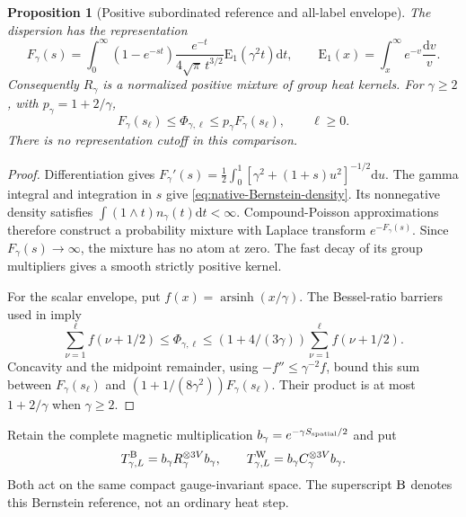 \documentclass[11pt,oneside,openany]{book}
\newtheorem{proposition}[proposition]{Proposition}
\theoremstyle{definition}
\theoremstyle{remark}
\newcommand{\dd}{\mathrm d}
\newcommand{\src}[2]{\cite[#2]{#1}}
\begin{document}
\begin{proposition}[Positive subordinated reference and all-label envelope]
\label{prop:native-Bernstein}
The dispersion has the representation
\begin{equation}
 F_\gamma(s)=\int_0^\infty(1-e^{-st})
       \frac{e^{-t}}{4\sqrt\pi\,t^{3/2}}
       \mathrm E_1(\gamma^2t)\dd t,
 \qquad \mathrm E_1(x)=\int_x^\infty e^{-v}\frac{\dd v}{v}.
 \label{eq:native-Bernstein-density}
\end{equation}
Consequently $R_\gamma$ is a normalized positive mixture of group heat
kernels. For $\gamma\ge2$, with $p_\gamma=1+2/\gamma$,
\begin{equation}
 F_\gamma(s_\ell)\le\Phi_{\gamma,\ell}
                   \le p_\gamma F_\gamma(s_\ell),\qquad \ell\ge0.
 \label{eq:native-all-label-envelope}
\end{equation}
There is no representation cutoff in this comparison.
\end{proposition}
\begin{proof}
Differentiation gives
$F_\gamma'(s)=\tfrac12\int_0^1[\gamma^2+(1+s)u^2]^{-1/2}\dd u$.
The gamma integral and integration in $s$ give
\cref{eq:native-Bernstein-density}. Its nonnegative density satisfies
$\int(1\wedge t)n_\gamma(t)\dd t<\infty$. Compound-Poisson
approximations therefore construct a probability mixture with Laplace
transform $e^{-F_\gamma(s)}$. Since $F_\gamma(s)\to\infty$, the
mixture has no atom at zero. The fast decay of its group multipliers
gives a smooth strictly positive kernel.

For the scalar envelope, put $f(x)=\operatorname{arsinh}(x/\gamma)$.
The Bessel-ratio barriers used in \src{F16B}{V52--V53} imply
\[
 \sum_{\nu=1}^{\ell}f(\nu+1/2)
 \le\Phi_{\gamma,\ell}
 \le(1+4/(3\gamma))\sum_{\nu=1}^{\ell}f(\nu+1/2).
\]
Concavity and the midpoint remainder, using
$-f''\le\gamma^{-2}f$, bound this sum between
$F_\gamma(s_\ell)$ and
$(1+1/(8\gamma^2))F_\gamma(s_\ell)$.
Their product is at most $1+2/\gamma$ when $\gamma\ge2$.
\end{proof}

Retain the complete magnetic multiplication
$b_\gamma=e^{-\gamma S_{\rm spatial}/2}$ and put
\[
 T^{\rm B}_{\gamma,L}=b_\gamma R_\gamma^{\otimes3V}b_\gamma,
 \qquad T^{\rm W}_{\gamma,L}=b_\gamma C_\gamma^{\otimes3V}b_\gamma.
\]
Both act on the same compact gauge-invariant space. The superscript
$\rm B$ denotes this Bernstein reference, not an ordinary heat step.
\end{document}
